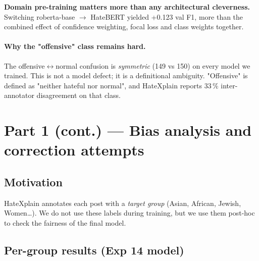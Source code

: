 \documentclass[11pt,a4paper]{article}
\begin{document}
\begin{lesson}
\textbf{Domain pre-training matters more than any architectural cleverness.}
Switching roberta-base $\to$ HateBERT yielded +0.123 val F1, more than the
combined effect of confidence weighting, focal loss and class weights together.
\end{lesson}

\paragraph{Why the "offensive" class remains hard.}
The offensive$\leftrightarrow$normal confusion is \emph{symmetric} (149 vs 150) on
every model we trained. This is not a model defect; it is a definitional ambiguity.
"Offensive" is defined as "neither hateful nor normal", and HateXplain reports
33\,\% inter-annotator disagreement on that class.

\section{Part 1 (cont.) --- Bias analysis and correction attempts}

\subsection{Motivation}

HateXplain annotates each post with a \emph{target group} (Asian, African, Jewish,
Women\dots). We do not use these labels during training, but we use them post-hoc
to check the fairness of the final model.

\subsection{Per-group results (Exp 14 model)}
\end{document}
